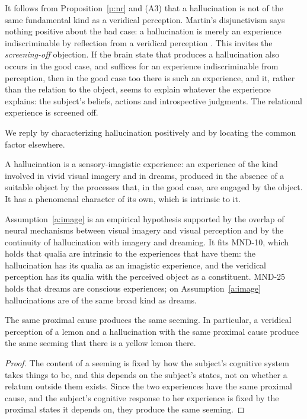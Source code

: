 \documentclass{situationist-preprint}
\begin{document}
It follows from Proposition~\ref{p:nr} and (A3) that a hallucination is not of the same fundamental kind as a veridical perception. Martin's disjunctivism says nothing positive about the bad case: a hallucination is merely an experience indiscriminable by reflection from a veridical perception \citep{Martin2004,Martin2006}. This invites the \emph{screening-off} objection. If the brain state that produces a hallucination also occurs in the good case, and suffices for an experience indiscriminable from perception, then in the good case too there is such an experience, and it, rather than the relation to the object, seems to explain whatever the experience explains: the subject's beliefs, actions and introspective judgments. The relational experience is screened off.

We reply by characterizing hallucination positively and by locating the common factor elsewhere.

\begin{assumption}\label{a:image}
A hallucination is a sensory-imagistic experience: an experience of the kind involved in vivid visual imagery and in dreams, produced in the absence of a suitable object by the processes that, in the good case, are engaged by the object. It has a phenomenal character of its own, which is intrinsic to it.
\end{assumption}

Assumption~\ref{a:image} is an empirical hypothesis supported by the overlap of neural mechanisms between visual imagery and visual perception and by the continuity of hallucination with imagery and dreaming. It fits MND-10, which holds that qualia are intrinsic to the experiences that have them: the hallucination has its qualia as an imagistic experience, and the veridical perception has its qualia with the perceived object as a constituent. MND-25 holds that dreams are conscious experiences; on Assumption~\ref{a:image} hallucinations are of the same broad kind as dreams.

\begin{lemma}\label{l:seem}
The same proximal cause produces the same seeming. In particular, a veridical perception of a lemon and a hallucination with the same proximal cause produce the same seeming that there is a yellow lemon there.
\end{lemma}

\begin{proof}
The content of a seeming is fixed by how the subject's cognitive system takes things to be, and this depends on the subject's states, not on whether a relatum outside them exists. Since the two experiences have the same proximal cause, and the subject's cognitive response to her experience is fixed by the proximal states it depends on, they produce the same seeming.
\end{proof}
\end{document}
